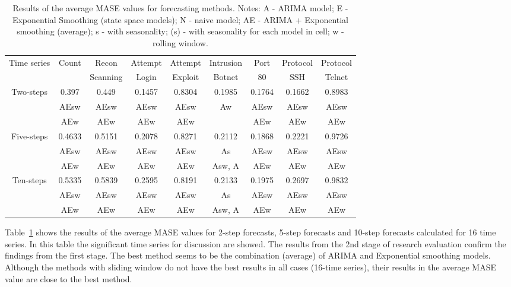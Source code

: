 \documentclass[runningheads]{llncs}
\begin{document}
\begin{table}[h]
    \centering
    \begin{tabular}{c|c|c|c|c|c|c|c|c} \hline
        \multirow{2}{*}{Time series} & Count & Recon & Attempt & Attempt & Intrusion & Port & Protocol & Protocol  \\
              &  & Scanning & Login & Exploit  & Botnet & 80 & SSH & Telnet  \\
        \hline\hline
        \multirow{3}{*}{Two-steps} & 0.397 & 0.449 & 0.1457 & 0.8304 & 0.1985 & 0.1764 & 0.1662 & 0.8983 \\
        & AEsw & AEsw & AEsw & AEsw & Aw & AEsw & AEsw & AEsw  \\
        & AEw & AEw & AEw & AEw &  & AEw & AEw & AEw \\
        \hline
        \multirow{3}{*}{Five-steps} & 0.4633 & 0.5151 & 0.2078 & 0.8271 & 0.2112 & 0.1868 & 0.2221 & 0.9726 \\
        & AEsw & AEsw & AEsw & AEsw & As & AEsw & AEsw & AEsw  \\
        & AEw & AEw & AEw & AEw & Asw, A & AEw & AEw & AEw \\
        \hline
        \multirow{3}{*}{Ten-steps} & 0.5335 & 0.5839 & 0.2595 & 0.8191 & 0.2133 & 0.1975 & 0.2697 & 0.9832 \\
        & AEsw & AEsw & AEsw & AEsw & As & AEsw & AEsw & AEsw  \\
        & AEw & AEw & AEw & AEw & Asw, A & AEw & AEw & AEw \\
        \hline     
    \end{tabular}
    \caption{Results of the average MASE values for forecasting methods. Notes: A - ARIMA model; E - Exponential Smoothing (state space models); N - naive model; AE - ARIMA + Exponential smoothing (average); s - with seasonality; (s) - with seasonality for each model in cell; w - rolling window.}
    \label{tab:mase_2nd_stage}
\end{table}


Table~\ref{tab:mase_2nd_stage} shows the results of the average MASE values for 2-step forecasts, 5-step forecasts and 10-step forecasts calculated for 16 time series. In this table the significant time series for discussion are showed. The results from the 2nd stage of research evaluation confirm the findings from the first stage. The best method seems to be the combination (average) of ARIMA and Exponential smoothing models. Although the methods with sliding window do not have the best results in all cases (16-time series), their results in the average MASE value are close to the best method.
\end{document}
